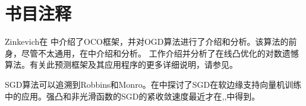 \newpage
\section{
书目注释
}

Zinkevich在 \cite{Zinkevich03}中介绍了OCO框架，并对OGD算法进行了介绍和分析。该算法的前身，尽管不太通用，在\cite{KivWar97}中介绍和分析。
工作\cite{HAK07}介绍并分析了在线凸优化的对数遗憾算法。有关此预测框架及其应用程序的更多详细说明，请参见\cite{OCObook}。

SGD算法可以追溯到Robbins和Monro\cite{robbins1951}。在\cite{Shalev-ShwartzSSC11}中探讨了SGD在软边缘支持向量机训练中的应用。强凸和非光滑函数的SGD的紧收敛速度最近才在\cite{hazan:beyond},\cite{RSS},\cite{SZ}中得到。


